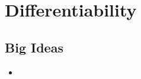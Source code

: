 \chapter{Differentiability}
\label{chap:D}

\section{Big Ideas}
\label{sec:D Big Ideas}
\begin{itemize}
  \item 
\end{itemize}